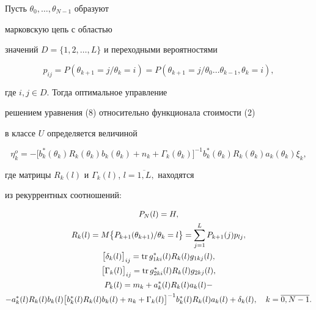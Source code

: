 \begin{cor} Пусть $\theta_{0},\dotsc,\theta_{N-1}$ образуют 


марковскую цепь с областью


значений $D=\bigl\{1,2,\dotsc,L\bigr\}$ и переходными вероятностями


$$


p_{ij}=P(\theta_{k+1}=j/\theta_{k}=i)=


P(\theta_{k+1}=j/\theta_{0}\dotsc\theta_{k-1},\theta_{k}=i),


$$


где $i,j \in D$. Тогда оптимальное управление


решением уравнения (8) относительно функционала стоимости (2) 


в классе $U$ определяется величиной


$$


\eta_{k}^{o}=-\bigl[b_{k}^{*}(\theta_{k})R_{k}(\theta_{k})


b_{k}(\theta_{k})+n_{k}+


\Gamma_{k}(\theta_{k})\bigr]^{-1}


b_{k}^{*}(\theta_{k})R_{k}(\theta_{k})a_{k}(\theta_{k})\xi_{k},


$$


где матрицы $R_{k}(l)$ и $\Gamma_{k}(l)$, $l=\overline{1,L},$ находятся


из рекуррентных соотношений:


\begin{gather*}


P_{N}(l)=H,\\


%


R_{k}(l)=M\bigl\{P_{k+1}(\theta_{k+1})/\theta_{k}=l


\bigr\}=\sum_{j=1}^{L}P_{k+1}(j)p_{lj},\\


%


\bigl[\delta_{k}(l)\bigr]_{ij}=\tr g_{1ki}^{*}(l)R_{k}(l)


g_{1kj}(l),\\


%


\bigl[\Gamma_{k}(l)\bigr]_{ij}=\tr g_{2ki}^{*}(l)R_{k}(l)


g_{2kj}(l),\\


%


P_{k}(l)=m_{k}+


a_{k}^{*}(l)R_{k}(l)a_{k}(l)-\\


%


-a_{k}^{*}(l)R_{k}(l)


b_{k}(l)\bigl[b_{k}^{*}(l)R_{k}(l)


b_{k}(l)+n_{k}+\Gamma_{k}(l)\bigr]^{-1}


b_{k}^{*}(l)R_{k}(l)


a_{k}(l)+\delta_{k}(l),\quad k=\overline{0,N-1}.


\end{gather*}


\end{cor}





